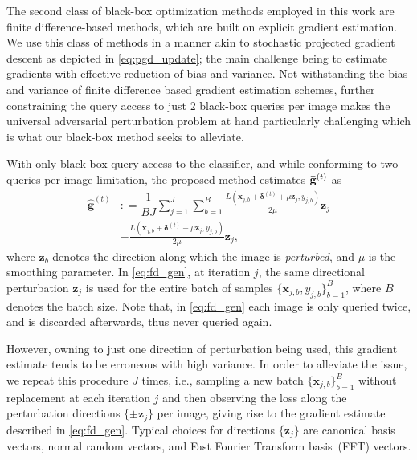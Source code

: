 \documentclass[letterpaper]{article}
\begin{document}
	The second class of black-box optimization methods employed in this work are finite difference-based methods, which are built on explicit gradient estimation. We use this class of methods in a manner akin to stochastic projected gradient descent as depicted in \eqref{eq:pgd_update}; the main challenge being to estimate gradients with effective reduction of bias and variance. Not withstanding the bias and variance of finite difference based gradient estimation schemes, further constraining the query access to just $2$ black-box queries per image makes the universal adversarial perturbation problem at hand particularly challenging which is what our black-box method seeks to alleviate.
	
	With only black-box query access to the classifier, and while conforming to two queries per image limitation, the proposed method estimates  $\mathbf{\Bar{g}}^{(t)}$ as
	\begin{align}
	\label{eq:fd_gen}
	\widehat{\mathbf{g}}^{(t)}  &: = \dfrac{1}{BJ}  \sum_{j=1}^{J}\sum_{b=1}^{B} \frac{L(\mathbf{x}_{j,b}+\bm{\delta}^{(t)}+\mu \mathbf{z}_j, y_{j,b})}{2\mu}\mathbf{z}_j\nonumber\\&-\frac{L(\mathbf{x}_{j,b}+\bm{\delta}^{(t)}-\mu \mathbf{z}_j, y_{j,b})}{2\mu}\mathbf{z}_j,
	\end{align}
	where $\mathbf{z}_b$ denotes the direction along which the image is \emph{perturbed}, and $\mu$ is the smoothing parameter. In \eqref{eq:fd_gen}, at iteration $j$, the same directional perturbation $\mathbf{z}_j$ is used for the entire batch of samples $\{\mathbf{x}_{j,b}, y_{j,b}\}_{b=1}^{B}$, where $B$ denotes the batch size. Note that, in \eqref{eq:fd_gen} each image is only queried twice, and is discarded afterwards, thus never queried again.
	
	
	However, owning to just one direction of perturbation being used, this gradient estimate tends to be erroneous with high variance. In order to alleviate the issue, we repeat this procedure $J$ times, i.e., sampling a new batch $\{\mathbf{x}_{j,b}\}_{b=1}^{B}$ without replacement at each iteration $j$ and then observing the loss along the perturbation directions $\{ \pm\mathbf{z}_j\}$ per image, giving rise to the gradient estimate described in \eqref{eq:fd_gen}.
	Typical choices for directions $\{\mathbf{z}_j\}$ are canonical basis vectors, normal random vectors, and Fast Fourier Transform basis~(FFT) vectors.
	
\end{document}
